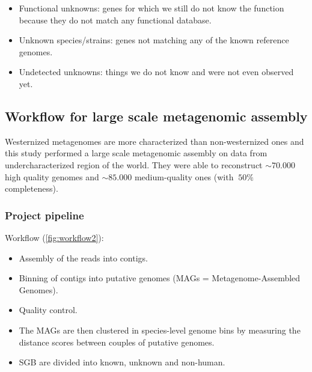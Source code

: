     \begin{multicols}{2}
        \begin{itemize}
            \item Functional unknowns: genes for which we still do not know the function because they do not match any functional database.
            \item Unknown species/strains: genes not matching any of the known reference genomes.
            \item Undetected unknowns: things we do not know and were not even observed yet.
        \end{itemize}
    \end{multicols}

    \subsection{Workflow for large scale metagenomic assembly}

    Westernized metagenomes are more characterized than non-westernized ones and this study performed a large scale metagenomic assembly on data from undercharacterized region of the world.
    They were able to reconstruct $\sim 70.000$ high quality genomes and $\sim 85.000$ medium-quality ones (with $~50\%$ completeness).

        \subsubsection{Project pipeline}
        Workflow (\ref{fig:workflow2}):

        \begin{multicols}{2}
            \begin{itemize}
                \item Assembly of the reads into contigs.
                \item Binning of contigs into putative genomes (MAGs = Metagenome-Assembled Genomes).
                \item Quality control.
                \item The MAGs are then clustered in species-level genome bins by measuring the distance scores between couples of putative genomes.
                \item SGB are divided into known, unknown and non-human.
            \end{itemize}
        \end{multicols}

